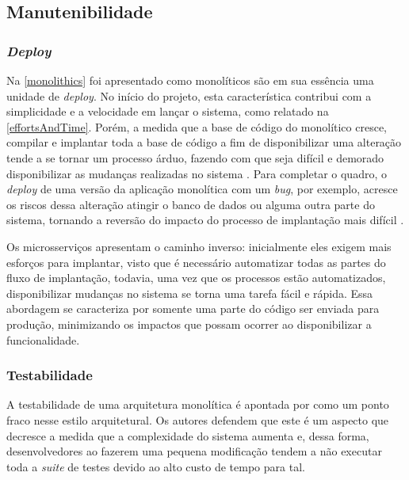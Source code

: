 \subsection{Manutenibilidade}

\subsubsection{\textit{Deploy}}
\label{pers:deploy}

Na \autoref{monolithics} foi apresentado como monolíticos são em sua essência uma unidade de
\textit{deploy}. No início do projeto, esta característica contribui com a simplicidade e a
velocidade em lançar o sistema, como relatado na \autoref{effortsAndTime}. Porém, a medida que a
base de código do monolítico cresce, compilar e implantar toda a base de código a fim de
disponibilizar uma alteração tende a se tornar um processo árduo, fazendo com que seja difícil e
demorado disponibilizar as mudanças realizadas no sistema \cite{MartinFowler:Microservices}. Para
completar o quadro, o \textit{deploy} de uma versão da aplicação monolítica com um \textit{bug},
por exemplo, acresce os riscos dessa alteração atingir o banco de dados ou alguma outra parte do
sistema, tornando a reversão do impacto do processo de implantação mais difícil
\cite{Richards2020:FundamentalsOfSoftwareArchitecture}.

Os microsserviços apresentam o caminho inverso: inicialmente eles exigem mais esforços para
implantar, visto que é necessário automatizar todas as partes do fluxo de implantação, todavia, uma
vez que os processos estão automatizados, disponibilizar mudanças no sistema se torna uma tarefa
fácil e rápida. Essa abordagem se caracteriza por somente uma parte do código ser enviada para
produção, minimizando os impactos que possam ocorrer ao disponibilizar a funcionalidade.

\subsubsection{Testabilidade}
\label{testabilidade}

A testabilidade de uma arquitetura monolítica é apontada por 
como um ponto fraco nesse estilo arquitetural. Os autores defendem que este é um aspecto que decresce a
medida que a complexidade do sistema aumenta e, dessa forma, desenvolvedores ao fazerem uma pequena
modificação tendem a não executar toda a \textit{suite} de testes devido ao alto custo de tempo para
tal.

